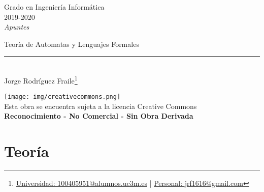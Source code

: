 \documentclass[12pt, twoside, openright]{report} %
\begin{document}

\begin{titlepage}
	\begin{sffamily}
		\color{azulUC3M}
		\begin{center}
			\begin{figure}[H] %
			\end{figure}
			\vspace{2.5cm}
			\begin{Large}
				Grado en Ingeniería Informática\\
				2019-2020\\
				\vspace{2cm}
				\textsl{Apuntes}\\
				\bigskip
			\end{Large}
			{\Huge Teoría de Automatas y Lenguajes Formales}\\
			\vspace*{0.5cm}
			\rule{10.5cm}{0.1mm}\\
			\vspace*{0.9cm}
			{\LARGE Jorge Rodríguez Fraile\footnote{\href{mailto:100405951@alumnos.uc3m.es}{Universidad: 100405951@alumnos.uc3m.es}  |  \href{mailto:jrf1616@gmail.com}{Personal: jrf1616@gmail.com}}}\\
			\vspace*{1cm}
		\end{center}
		\vfill
		\color{black}
		\texttt{[image: img/creativecommons.png]}\\
		Esta obra se encuentra sujeta a la licencia Creative Commons\\ \textbf{Reconocimiento - No Comercial - Sin Obra Derivada}
	\end{sffamily}
\end{titlepage}


\tableofcontents
\thispagestyle{fancy}






\part{Teoría}

\end{document}
